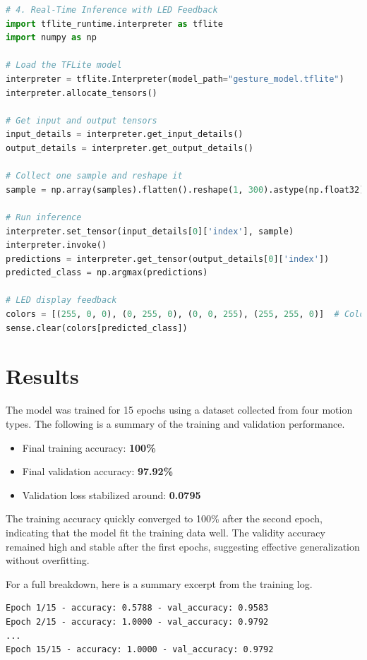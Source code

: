 \documentclass[a4paper,12pt]{article}
\begin{document}
\begin{lstlisting}[language=Python, caption=Real-Time Inference and LED Feedback on Raspberry Pi]
# 4. Real-Time Inference with LED Feedback
import tflite_runtime.interpreter as tflite
import numpy as np

# Load the TFLite model
interpreter = tflite.Interpreter(model_path="gesture_model.tflite")
interpreter.allocate_tensors()

# Get input and output tensors
input_details = interpreter.get_input_details()
output_details = interpreter.get_output_details()

# Collect one sample and reshape it
sample = np.array(samples).flatten().reshape(1, 300).astype(np.float32)

# Run inference
interpreter.set_tensor(input_details[0]['index'], sample)
interpreter.invoke()
predictions = interpreter.get_tensor(output_details[0]['index'])
predicted_class = np.argmax(predictions)

# LED display feedback
colors = [(255, 0, 0), (0, 255, 0), (0, 0, 255), (255, 255, 0)]  # Colors for each gesture
sense.clear(colors[predicted_class])
\end{lstlisting}

\section{Results}
The model was trained for 15 epochs using a dataset collected from four motion types. The following is a summary of the training and validation performance.

\begin{itemize}
    \item Final training accuracy: \textbf{100\%}
    \item Final validation accuracy: \textbf{97.92\%}
    \item Validation loss stabilized around: \textbf{0.0795}
\end{itemize}

The training accuracy quickly converged to 100\% after the second epoch, indicating that the model fit the training data well. The validity accuracy remained high and stable after the first epochs, suggesting effective generalization without overfitting.

For a full breakdown, here is a summary excerpt from the training log.

\begin{lstlisting}
Epoch 1/15 - accuracy: 0.5788 - val_accuracy: 0.9583
Epoch 2/15 - accuracy: 1.0000 - val_accuracy: 0.9792
...
Epoch 15/15 - accuracy: 1.0000 - val_accuracy: 0.9792
\end{lstlisting}
\end{document}
